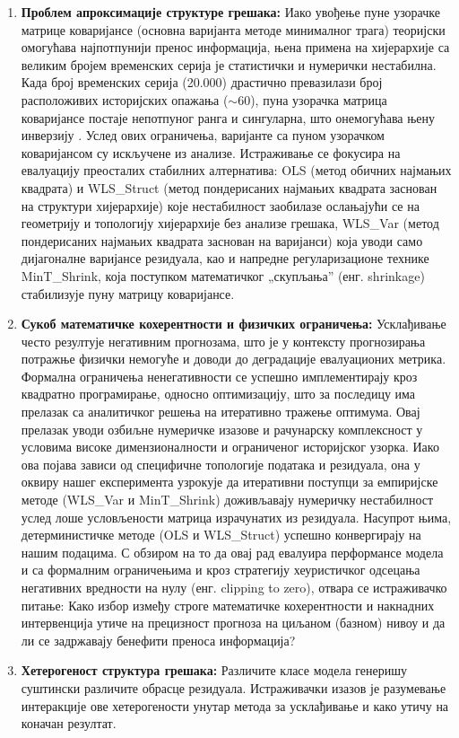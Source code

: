 \documentclass[12pt,oneside]{memoir}
\begin{document}
\begin{enumerate}
\item \textbf{Проблем апроксимације структуре грешака:} Иако увођење пуне узорачке матрице коваријансе (основна варијанта методе минималног трага) теоријски омогућава најпотпунији пренос информација, њена примена на хијерархије са великим бројем временских серија је статистички и нумерички нестабилна. Када број временских серија (20.000) драстично превазилази број расположивих историјских опажања ($\sim$60), пуна узорачка матрица коваријансе постаје непотпуног ранга и сингуларна, што онемогућава њену инверзију \cite{schafer2005shrinkage}. Услед ових ограничења, варијанте са пуном узорачком коваријансом су искључене из анализе. Истраживање се фокусира на евалуацију преосталих стабилних алтернатива: OLS (метод обичних најмањих квадрата) и WLS\_Struct (метод пондерисаних најмањих квадрата заснован на структури хијерархије) које нестабилност заобилазе ослањајући се на геометрију и топологију хијерархије без анализе грешака, WLS\_Var (метод пондерисаних најмањих квадрата заснован на варијанси) која уводи само дијагоналне варијансе резидуала,  као и напредне регуларизационе технике MinT\_Shrink, која поступком математичког „скупљања” (енг. shrinkage) стабилизује пуну матрицу коваријансе.

\item \textbf{Сукоб математичке кохерентности и физичких ограничења:} Усклађивање често резултује негативним прогнозама, што је у контексту прогнозирања потражње физички немогуће и доводи до деградације евалуационих метрика. Формална ограничења ненегативности се успешно имплементирају кроз квадратно програмирање, односно оптимизацију, што за последицу има прелазак са аналитичког решења на итеративно тражење оптимума. Овај прелазак уводи озбиљне нумеричке изазове и рачунарску комплексност у условима високе димензионалности и ограниченог историјског узорка. Иако ова појава зависи од специфичне топологије података и резидуала, она у оквиру нашег експеримента узрокује да итеративни поступци за емпиријске методе (WLS\_Var и MinT\_Shrink) доживљавају нумеричку нестабилност услед лоше условљености матрица израчунатих из резидуала.  Насупрот њима, детерминистичке методе (OLS и WLS\_Struct) успешно конвергирају на нашим подацима. С обзиром на то да овај рад евалуира перформансе модела и са формалним ограничењима и кроз стратегију хеуристичког одсецања негативних вредности на нулу (енг. clipping to zero), отвара се истраживачко питање: Како избор између строге математичке кохерентности и накнадних интервенција утиче на прецизност прогноза на циљаном (базном) нивоу и да ли се задржавају бенефити преноса информација?

\item \textbf{Хетерогеност структура грешака:} Различите класе модела генеришу суштински различите обрасце резидуала. Истраживачки изазов је разумевање интеракције ове хетерогености унутар метода за усклађивање и како утичу на коначан резултат.
\end{enumerate}
\end{document}

